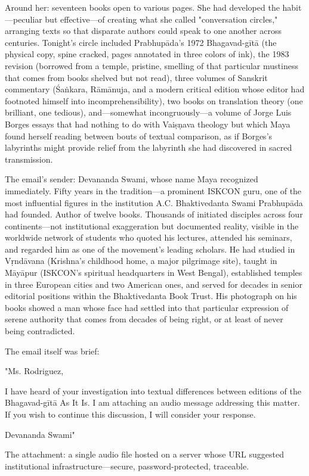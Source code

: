 \documentclass[12pt,twoside]{book}
\begin{document}
Around her: seventeen books open to various pages. She had developed the habit—peculiar but effective—of creating what she called "conversation circles," arranging texts so that disparate authors could speak to one another across centuries. Tonight's circle included Prabhupāda's 1972 Bhagavad-gītā (the physical copy, spine cracked, pages annotated in three colors of ink), the 1983 revision (borrowed from a temple, pristine, smelling of that particular mustiness that comes from books shelved but not read), three volumes of Sanskrit commentary (Śaṅkara, Rāmānuja, and a modern critical edition whose editor had footnoted himself into incomprehensibility), two books on translation theory (one brilliant, one tedious), and—somewhat incongruously—a volume of Jorge Luis Borges essays that had nothing to do with Vaiṣṇava theology but which Maya found herself reading between bouts of textual comparison, as if Borges's labyrinths might provide relief from the labyrinth she had discovered in sacred transmission.

The email's sender: Devananda Swami, whose name Maya recognized immediately. Fifty years in the tradition—a prominent ISKCON guru, one of the most influential figures in the institution A.C. Bhaktivedanta Swami Prabhupāda had founded. Author of twelve books. Thousands of initiated disciples across four continents—not institutional exaggeration but documented reality, visible in the worldwide network of students who quoted his lectures, attended his seminars, and regarded him as one of the movement's leading scholars. He had studied in Vṛndāvana (Krishna's childhood home, a major pilgrimage site), taught in Māyāpur (ISKCON's spiritual headquarters in West Bengal), established temples in three European cities and two American ones, and served for decades in senior editorial positions within the Bhaktivedanta Book Trust. His photograph on his books showed a man whose face had settled into that particular expression of serene authority that comes from decades of being right, or at least of never being contradicted.

The email itself was brief:

"Ms. Rodriguez,

I have heard of your investigation into textual differences between editions of the Bhagavad-gītā As It Is. I am attaching an audio message addressing this matter. If you wish to continue this discussion, I will consider your response.

Devananda Swami"

The attachment: a single audio file hosted on a server whose URL suggested institutional infrastructure—secure, password-protected, traceable.
\end{document}
